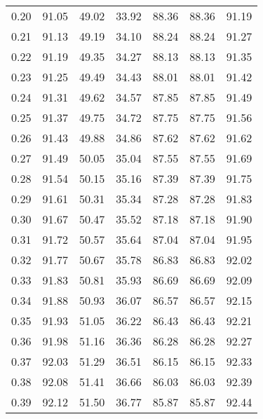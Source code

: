 \begin{tabular}{|c|c|c|c|c|c|c|}
      0.20 &     91.05 &     49.02 &      33.92 &   88.36 &      88.36 &         91.19 \\
      0.21 &     91.13 &     49.19 &      34.10 &   88.24 &      88.24 &         91.27 \\
      0.22 &     91.19 &     49.35 &      34.27 &   88.13 &      88.13 &         91.35 \\
      0.23 &     91.25 &     49.49 &      34.43 &   88.01 &      88.01 &         91.42 \\
      0.24 &     91.31 &     49.62 &      34.57 &   87.85 &      87.85 &         91.49 \\
      0.25 &     91.37 &     49.75 &      34.72 &   87.75 &      87.75 &         91.56 \\
      0.26 &     91.43 &     49.88 &      34.86 &   87.62 &      87.62 &         91.62 \\
      0.27 &     91.49 &     50.05 &      35.04 &   87.55 &      87.55 &         91.69 \\
      0.28 &     91.54 &     50.15 &      35.16 &   87.39 &      87.39 &         91.75 \\
      0.29 &     91.61 &     50.31 &      35.34 &   87.28 &      87.28 &         91.83 \\
      0.30 &     91.67 &     50.47 &      35.52 &   87.18 &      87.18 &         91.90 \\
      0.31 &     91.72 &     50.57 &      35.64 &   87.04 &      87.04 &         91.95 \\
      0.32 &     91.77 &     50.67 &      35.78 &   86.83 &      86.83 &         92.02 \\
      0.33 &     91.83 &     50.81 &      35.93 &   86.69 &      86.69 &         92.09 \\
      0.34 &     91.88 &     50.93 &      36.07 &   86.57 &      86.57 &         92.15 \\
      0.35 &     91.93 &     51.05 &      36.22 &   86.43 &      86.43 &         92.21 \\
      0.36 &     91.98 &     51.16 &      36.36 &   86.28 &      86.28 &         92.27 \\
      0.37 &     92.03 &     51.29 &      36.51 &   86.15 &      86.15 &         92.33 \\
      0.38 &     92.08 &     51.41 &      36.66 &   86.03 &      86.03 &         92.39 \\
      0.39 &     92.12 &     51.50 &      36.77 &   85.87 &      85.87 &         92.44 \\

\end{tabular}

